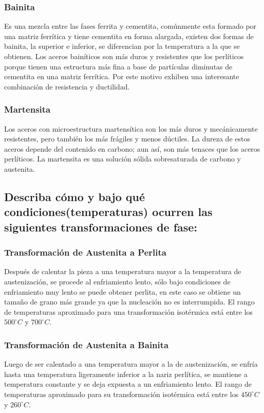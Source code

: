 \documentclass[a4paper, 9pt]{article}
\begin{document}
\subsubsection{Bainita}
Es una mezcla entre las fases ferrita y cementita, comúnmente esta formado por una matriz ferrítica y tiene cementita en forma alargada, existen dos formas de bainita, la superior e inferior, se diferencian por la temperatura a la que se obtienen. Los aceros bainíticos son más duros y resistentes que los perlíticos porque tienen una estructura más fina a base de partículas diminutas de cementita en una matriz ferrítica. Por este motivo exhiben una interesante combinación de resistencia y ductilidad.
\subsubsection{Martensita}
Los aceros con microestructura martensítica son los más duros y mecánicamente resistentes, pero también los más frágiles y menos dúctiles. La dureza de estos aceros depende del contenido en carbono; aun así, son más tenaces que los aceros perlíticos. La martensita es una solución sólida sobresaturada de carbono y austenita.

\subsection{Describa cómo y bajo qué condiciones(temperaturas) ocurren las siguientes transformaciones de fase:}
\subsubsection{Transformación de Austenita a Perlita}
Después de calentar la pieza a una temperatura mayor a la temperatura de austenización, se procede al enfriamiento lento, sólo bajo condiciones de enfriamiento muy lento se puede obtener perlita, en este caso se obtiene un tamaño de grano más grande ya que  la nucleación no es interrumpida.
El rango de temperaturas aproximado para una transformación isotérmica  está entre los $500^{\circ}C$ y $700^{\circ}C$.
\subsubsection{Transformación de Austenita a Bainita}
Luego de ser calentado a una temperatura mayor a la de austenización, se enfría hasta una temperatura ligeramente inferior a la nariz perlítica, se mantiene a temperatura constante y se deja expuesta a un enfriamiento lento.
El rango de temperaturas aproximado para su transformación isotérmica está entre los $450^{\circ}C$ y $260^{\circ}C$.
\end{document}
